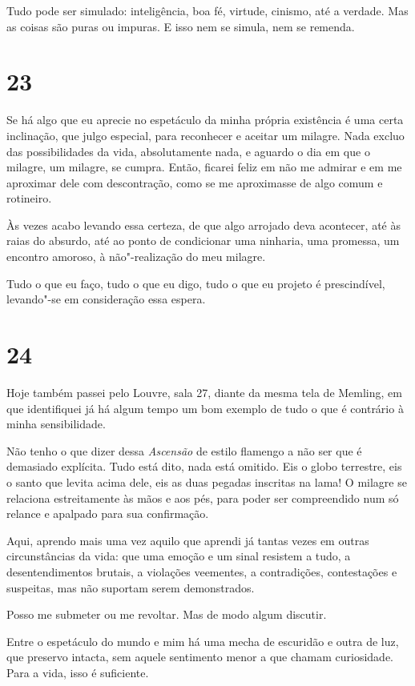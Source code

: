 Tudo pode ser simulado: inteligência, boa fé, virtude, cinismo, até a
verdade. Mas as coisas são puras ou impuras. E isso nem se simula, nem
se remenda.

\section{23}

Se há algo que eu aprecie no espetáculo da minha própria existência é
uma certa inclinação, que julgo especial, para reconhecer e aceitar um
milagre. Nada excluo das possibilidades da vida, absolutamente nada, e
aguardo o dia em que o milagre, um milagre, se cumpra. Então, ficarei
feliz em não me admirar e em me aproximar dele com descontração, como se
me aproximasse de algo comum e rotineiro.

Às vezes acabo levando essa certeza, de que algo arrojado deva
acontecer, até às raias do absurdo, até ao ponto de condicionar uma
ninharia, uma promessa, um encontro amoroso, à não"-realização do meu
milagre.

Tudo o que eu faço, tudo o que eu digo, tudo o que eu projeto é
prescindível, levando"-se em consideração essa espera.

\section{24}

Hoje também passei pelo Louvre, sala 27, diante da mesma tela de
Memling, em que identifiquei já há algum tempo um bom exemplo de tudo o
que é contrário à minha sensibilidade.

Não tenho o que dizer dessa \emph{Ascensão} de estilo flamengo a não ser
que é demasiado explícita. Tudo está dito, nada está omitido. Eis o
globo terrestre, eis o santo que levita acima dele, eis as duas pegadas
inscritas na lama! O milagre se relaciona estreitamente às mãos e aos
pés, para poder ser compreendido num só relance e apalpado para sua
confirmação.

Aqui, aprendo mais uma vez aquilo que aprendi já tantas vezes em outras
circunstâncias da vida: que uma emoção e um sinal resistem a tudo, a
desentendimentos brutais, a violações veementes, a contradições,
contestações e suspeitas, mas não suportam serem demonstrados.

Posso me submeter ou me revoltar. Mas de modo algum discutir.

Entre o espetáculo do mundo e mim há uma mecha de escuridão e outra de
luz, que preservo intacta, sem aquele sentimento menor a que chamam
curiosidade. Para a vida, isso é suficiente.
